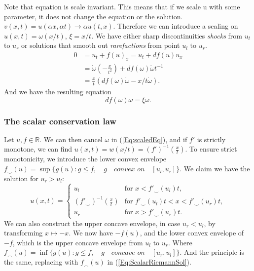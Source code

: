 \documentclass[10pt]{article}
\numberwithin{equation}{section}
\begin{document}
Note that equation is scale invariant. This means that if we scale u with some parameter, it does not change the equation or the solution. $v(x,t) = u(\alpha x, \alpha t) \rightarrow \alpha u(t,x)$. Therefore we can introduce a scaling on $u(x,t) = \omega (x/t) $, $ \xi = x/t$. We have either sharp discontinuities \textit{shocks} from $u_l$ to $u_r$ or solutions that smooth out \textit{rarefactions} from point $u_l$ to $u_r$. 
 \begin{equation*}
     \begin{split}
         0 &= u_t + f(u)_x = u_t + df(u)u_x \\
           &= \dot \omega( -\frac{x}{t^2}) + df( \omega) \dot \omega t^{-1} \\
           &= \frac{x}{t}(  df( \omega) \dot \omega - x/t \dot \omega ).
     \end{split}
 \end{equation*}
 And we have the resulting equation 
 \begin{equation}
     df( \omega) \dot \omega =  \xi \dot \omega.
     \label{Eq:scaledEq}
 \end{equation}

\subsubsection{The scalar conservation law}
Let $u,f \in \mathbb{R}$. We can then cancel $\dot \omega $ in (\ref{Eq:scaledEq}), and if $f'$ is strictly monotone, we can find $u(x,t) = w(x/t) = (f')^{-1}(\frac{x}{t})$. 
To ensure strict monotonicity, we introduce the lower convex envelope $f_{\smile}(u) = \sup\{g(u) : g\leq f, \quad  g \quad \textit{convex on}\quad [u_l, u_r]\} $. We claim we have the solution for $u_r > u_l$:
 \begin{equation}
     u(x,t) = \begin{cases} u_l & \text{for $x < f'_{\smile} (u_l)t$,}\\
                            (f'_{\smile} )^{-1}(\frac{x}{t}) & \text{for $f'_{\smile} (u_l)t$} < x < f'_{\smile} (u_r)t,\\ 
                            u_r & \text{for $x > f'_{\smile} (u_r)t$}. 
     \end{cases}
     \label{Eq:ScalarRiemannSol}
 \end{equation}
We can also construct the upper concave envelope, in case $u_r < u_l$, by transforming $x \mapsto -x$. We now have $-f(u)$, and the lower convex envelope of $-f$, which is the upper concave envelope from $u_l$ to $u_r$.  Where $f_{\frown}(u) = \inf\{g(u) : g\leq f, \quad g \quad \textit{concave on} \quad  [u_r, u_l]\} $. And the principle is the same, replacing with $f_{\frown}(u)$ in (\ref{Eq:ScalarRiemannSol}). 
\end{document}

